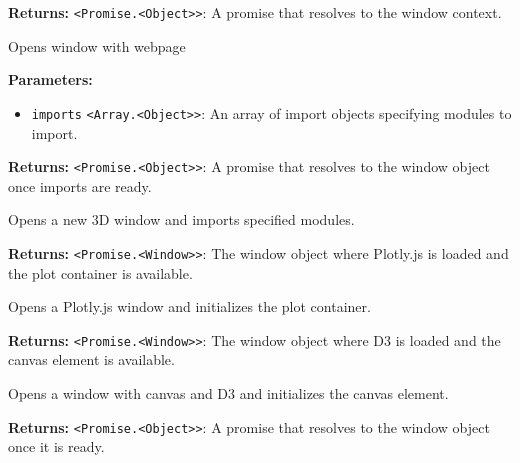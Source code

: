 \documentclass[12pt,a4paper]{article}
\begin{document}
\noindent \textbf{Returns:} \texttt{<Promise.<Object>>}: A promise that resolves to the window context.

\noindent Opens window with webpage

\vspace{5mm}
\noindent {}


\noindent \textbf{Parameters:}
\begin{itemize}
  \item \texttt{imports} \texttt{<Array.<Object>>}: An array of import objects specifying modules to import.
\end{itemize}

\noindent \textbf{Returns:} \texttt{<Promise.<Object>>}: A promise that resolves to the window object once imports are ready.

\noindent Opens a new 3D window and imports specified modules.

\vspace{5mm}
\noindent {}


\noindent \textbf{Returns:} \texttt{<Promise.<Window>>}: The window object where Plotly.js is loaded and the plot container is available.

\noindent Opens a Plotly.js window and initializes the plot container.

\vspace{5mm}
\noindent {}


\noindent \textbf{Returns:} \texttt{<Promise.<Window>>}: The window object where D3 is loaded and the canvas element is available.

\noindent Opens a window with canvas and D3 and initializes the canvas element.

\vspace{5mm}
\noindent {}


\noindent \textbf{Returns:} \texttt{<Promise.<Object>>}: A promise that resolves to the window object once it is ready.
\end{document}
